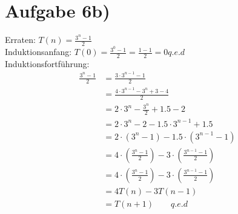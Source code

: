 \documentclass[a4paper,10pt,freqn]{article}
\begin{document}
\section{Aufgabe 6b)}
Erraten: $T(n)=\frac{3^n-1}{2}$\\
Induktionsanfang: $T(0) = \frac{3^0-1}{2} = \frac{1-1}{2} = 0 q.e.d$\\
Induktionsfortführung:
\begin{align*}
 \frac{3^n-1}{2} &= \frac{3\cdot3^{n-1}-1}{2}\\
 &= \frac{4\cdot3^{n-1}-3^n+3-4}{2}\\
 &= 2\cdot3^n-\frac{3^n}{2}+1.5-2\\
 &= 2\cdot3^n-2-1.5\cdot3^{n-1}+1.5\\
 &= 2\cdot(3^n-1)-1.5\cdot(3^{n-1}-1)\\
 &= 4\cdot(\frac{3^n-1}{2})-3\cdot(\frac{3^{n-1}-1}{2})\\
 &= 4\cdot(\frac{3^n-1}{2})-3\cdot(\frac{3^{n-1}-1}{2})\\
 &= 4T(n)-3T(n-1)\\
 &= T(n+1)\qquad q.e.d
\end{align*}
\end{document}
